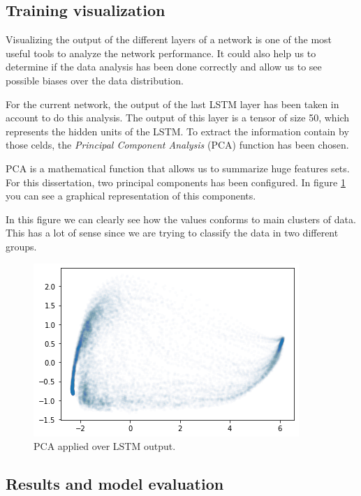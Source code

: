 \subsection{Training visualization}

Visualizing the output of the different layers of a network is one of the most useful tools to analyze the network performance. It could also help us to determine if the data analysis has been done correctly and allow us to see possible biases over the data distribution.

For the current network, the output of the last LSTM layer has been taken in account to do this analysis. The output of this layer is a tensor of size 50, which represents the hidden units of the LSTM. To extract the information contain by those celds, the \textit{Principal Component Analysis} (PCA) function has been chosen.

PCA is a mathematical function that allows us to summarize huge features sets. For this dissertation, two principal components has been configured. In figure \ref{fig:binary-lstm-pca} you can see a graphical representation of this components.

In this figure we can clearly see how the values conforms to main clusters of data. This has a lot of sense since we are trying to classify the data in two different groups.

\begin{figure}[H]
\centering
\includegraphics{Figures/lstm-visualization}
\decoRule
\caption[PCA applied over LSTM output]{PCA applied over LSTM output.}
\label{fig:binary-lstm-pca}
\end{figure}


\subsection{Results and model evaluation}

